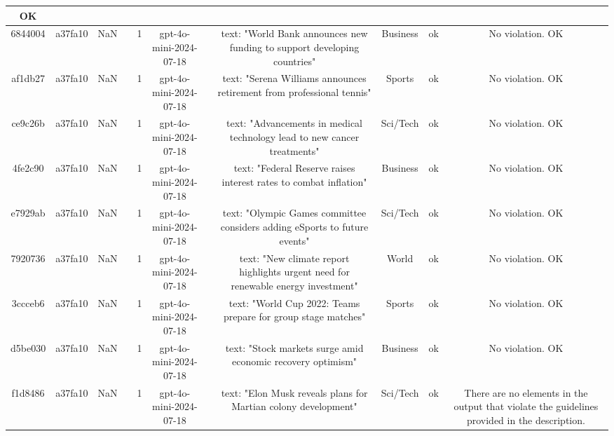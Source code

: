 \begin{table}[h!]
\begin{tabular}{|c|c|c|c|c|c|c|c|c|c|c|}
OK\\
\hline
6844004 & a37fa10 & NaN &  & 1 & gpt-4o-mini-2024-07-18 &  & text: "World Bank announces new funding to support developing countries" & Business & ok & No violation.
OK\\
\hline
af1db27 & a37fa10 & NaN &  & 1 & gpt-4o-mini-2024-07-18 &  & text: "Serena Williams announces retirement from professional tennis" & Sports & ok & No violation.
OK\\
\hline
ce9c26b & a37fa10 & NaN &  & 1 & gpt-4o-mini-2024-07-18 &  & text: "Advancements in medical technology lead to new cancer treatments" & Sci/Tech & ok & No violation.
OK\\
\hline
4fe2c90 & a37fa10 & NaN &  & 1 & gpt-4o-mini-2024-07-18 &  & text: "Federal Reserve raises interest rates to combat inflation" & Business & ok & No violation.
OK\\
\hline
e7929ab & a37fa10 & NaN &  & 1 & gpt-4o-mini-2024-07-18 &  & text: "Olympic Games committee considers adding eSports to future events" & Sci/Tech & ok & No violation.
OK\\
\hline
7920736 & a37fa10 & NaN &  & 1 & gpt-4o-mini-2024-07-18 &  & text: "New climate report highlights urgent need for renewable energy investment" & World & ok & No violation.
OK\\
\hline
3ccceb6 & a37fa10 & NaN &  & 1 & gpt-4o-mini-2024-07-18 &  & text: "World Cup 2022: Teams prepare for group stage matches" & Sports & ok & No violation.
OK\\
\hline
d5be030 & a37fa10 & NaN &  & 1 & gpt-4o-mini-2024-07-18 &  & text: "Stock markets surge amid economic recovery optimism" & Business & ok & No violation.
OK\\
\hline
f1d8486 & a37fa10 & NaN &  & 1 & gpt-4o-mini-2024-07-18 &  & text: "Elon Musk reveals plans for Martian colony development" & Sci/Tech & ok & There are no elements in the output that violate the guidelines provided in the description. 


\end{tabular}
\end{table}
